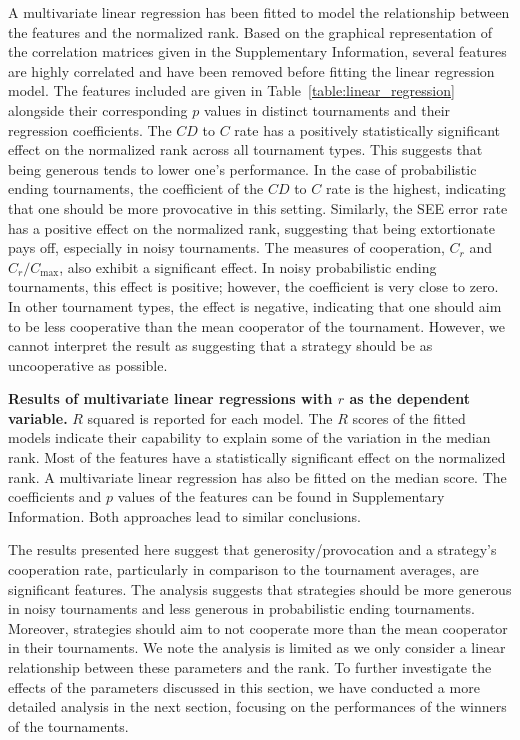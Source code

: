 \documentclass{article}
\begin{document}
A multivariate linear regression has been fitted to model the relationship
between the features and the normalized rank. Based on the graphical
representation of the correlation matrices given in the Supplementary
Information, several features are highly correlated and have been removed before
fitting the linear regression model. The features included are given in
Table~\ref{table:linear_regression} alongside their corresponding \(p\) values
in distinct tournaments and their regression coefficients. The \(CD\) to \(C\)
rate has a positively statistically significant effect on the normalized rank
across all tournament types. This suggests that being generous tends to
lower one's performance. In the case of probabilistic ending tournaments, the
coefficient of the \(CD\) to \(C\) rate is the highest, indicating that one
should be more provocative in this setting. Similarly, the SEE error rate has a
positive effect on the normalized rank, suggesting that being extortionate pays
off, especially in noisy tournaments. The measures of cooperation, \(C_r\) and
\(C_r / C_{\text{max}}\), also exhibit a significant effect. In noisy
probabilistic ending tournaments, this effect is positive; however, the
coefficient is very close to zero. In other tournament types, the effect is
negative, indicating that one should aim to be less cooperative than the mean
cooperator of the tournament. However, we cannot interpret the result as
suggesting that a strategy should be as uncooperative as possible.

\begin{table}[!htbp]
    \begin{center}
\resizebox{.8\textwidth}{!}{
    }
    \end{center}
    \caption{\textbf{Results of multivariate linear regressions with \(r\) as
    the dependent variable.} \(R\) squared is reported for each model. The $R$
    scores of the fitted models indicate their capability to explain some of the
    variation in the median rank. Most of the features have a statistically
    significant effect on the normalized rank.
    A multivariate linear regression has also be fitted on the median score. The
    coefficients and \(p\) values of the features can be found in
    Supplementary Information. Both approaches lead to similar conclusions.}
    \label{table:linear_regression}
\end{table}

The results presented here suggest that generosity/provocation and a strategy's
cooperation rate, particularly in comparison to the tournament averages, are
significant features. The analysis suggests that strategies should be more
generous in noisy tournaments and less generous in probabilistic ending
tournaments. Moreover, strategies should aim to not cooperate more than the mean
cooperator in their tournaments. We note the analysis is limited as we only
consider a linear relationship between these parameters and the rank. To further
investigate the effects of the parameters discussed in this section, we have
conducted a more detailed analysis in the next section, focusing on the
performances of the winners of the tournaments.
\end{document}
